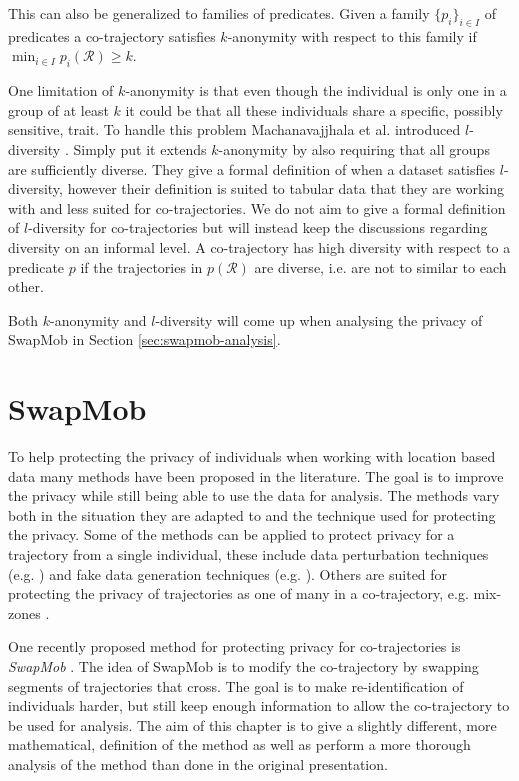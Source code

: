 \documentclass[12pt]{article}
\newcommand{\cotraj}{\mathcal{R}}
\newcommand{\pred}{p}
\theoremstyle{definition}
\begin{document}
This can also be generalized to families of predicates. Given a family
\(\{\pred_{i}\}_{i \in I}\) of predicates a co-trajectory satisfies
\(k\)-anonymity with respect to this family if
\(\min_{i \in I}\pred_{i}(\cotraj) \geq k\).

One limitation of \(k\)-anonymity is that even though the individual
is only one in a group of at least \(k\) it could be that all these
individuals share a specific, possibly sensitive, trait. To handle
this problem Machanavajjhala et al. introduced \(l\)-diversity
\cite{machanavajjhala_l-diversity:_2006}. Simply put it extends
\(k\)-anonymity by also requiring that all groups are sufficiently
diverse. They give a formal definition of when a dataset satisfies
\(l\)-diversity, however their definition is suited to tabular data
that they are working with and less suited for co-trajectories. We do
not aim to give a formal definition of \(l\)-diversity for
co-trajectories but will instead keep the discussions regarding
diversity on an informal level. A co-trajectory has high diversity
with respect to a predicate \(\pred\) if the trajectories in
\(\pred(\cotraj)\) are diverse, i.e. are not to similar to each other.

Both \(k\)-anonymity and \(l\)-diversity will come up when analysing
the privacy of SwapMob in Section \ref{sec:swapmob-analysis}.

\section{SwapMob}
\label{sec:swapmob}
To help protecting the privacy of individuals when working with
location based data many methods have been proposed in the literature.
The goal is to improve the privacy while still being able to use the
data for analysis. The methods vary both in the situation they are
adapted to and the technique used for protecting the privacy. Some of
the methods can be applied to protect privacy for a trajectory from a
single individual, these include data perturbation techniques (e.g.
\cite{andres_geo-indistinguishability:_2013, ghinita_prive:_2007,
  jiang_publishing_2013}) and fake data generation techniques (e.g.
\cite{quercia_spotme_2011, pelekis_privacy-aware_2011,
  kido_protection_2005}). Others are suited for protecting the privacy
of trajectories as one of many in a co-trajectory, e.g. mix-zones
\cite{beresford_location_2003, beresford_mix_2004}.

One recently proposed method for protecting privacy for
co-trajectories is \emph{SwapMob} \cite{salas_swapmob:_2018}. The idea
of SwapMob is to modify the co-trajectory by swapping segments of
trajectories that cross. The goal is to make re-identification of
individuals harder, but still keep enough information to allow the
co-trajectory to be used for analysis. The aim of this chapter is to
give a slightly different, more mathematical, definition of the method
as well as perform a more thorough analysis of the method than done in
the original presentation.
\end{document}
